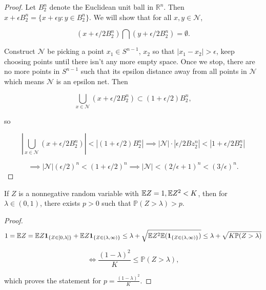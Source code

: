 \begin{proof}

Let \(B_2^n\) denote the Euclidean unit ball in \(\mathbb{R}^n\). Then \(x + \epsilon B_2^n = \{x + \epsilon y: y \in B_2^n\}\). We will show that for all \(x, y \in \mathcal{N}\), 

\[
(x + \epsilon/2 B_2^n) \bigcap (y + \epsilon/2 B_2^n) = \emptyset.
\]

Construct \(\mathcal{N}\) be picking a point \(x_1 \in S^{n-1}\), \(x_2\) so that \(|x_1 - x_2| > \epsilon\), keep choosing points until there isn't any more empty space. Once we stop, there are no more points in \(S^{n-1}\) such that its epsilon distance away from all points in \(\mathcal{N}\) which means \(\mathcal{N}\) is an epsilon net. Then

\[
\bigcup_{x \in \mathcal{N}} (x + \epsilon/2 B_2^n) \subset (1 + \epsilon/2) B_2^n,
\]

so

\[
\left| \bigcup_{x \in \mathcal{N}} (x + \epsilon/2 B_2^n) \right| < \left| (1 + \epsilon/2) B_2^n \right| \implies | \mathcal{N} | \cdot | \epsilon/2 Bz_2^n | < | 1 + \epsilon/2 B_2^n|
\]

\[
\implies | \mathcal{N} | (\epsilon/2)^n < ( 1 + \epsilon/2)^n \implies | \mathcal{N} | < (2/\epsilon + 1)^n < (3/\epsilon)^n.
\]

\end{proof}

\begin{proposition}

If \(Z\) is a nonnegative random variable with \(\mathbb{E} Z = 1, \mathbb{E} Z^2 < K\), then for \(\lambda \in (0,1)\), there exists \(p > 0\) such that \(\mathbb{P}(Z > \lambda) > p\).

\end{proposition}

\begin{proof}

\[
1 = \mathbb{E} Z = \mathbb{E} Z \boldsymbol{1}_{\{Z \in [0, \lambda]\}} + \mathbb{E} Z \boldsymbol{1}_{\{Z \in ( \lambda, \infty)\}} \leq \lambda + \sqrt{ \mathbb{E} Z^2 \mathbb{E} ( \boldsymbol{1}_{\{Z \in ( \lambda, \infty)\}})} \leq \lambda + \sqrt{K \mathbb{P}(Z > \lambda)}
\]

\[
\iff \frac{(1-\lambda)^2}{K} \leq \mathbb{P}(Z > \lambda),
\]

which proves the statement for \(p =  \frac{(1-\lambda)^2}{K} \).

\end{proof}

